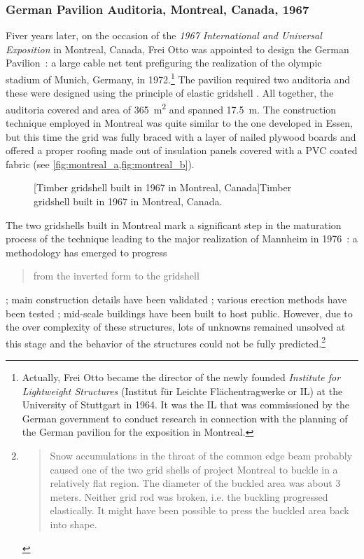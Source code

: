 \subsubsection{German Pavilion Auditoria, Montreal, Canada, 1967}
Fiver years later, on the occasion of the \emph{1967 International and Universal Exposition} in Montreal, Canada, Frei Otto was appointed to design the German Pavilion~: a large cable net tent prefiguring the realization of the olympic stadium of Munich, Germany, in 1972.\footnote{Actually, Frei Otto became the director of the newly founded \emph{Institute for Lightweight Structures} (Institut für Leichte Flächentragwerke or IL) at the University of Stuttgart in 1964. It was the IL that was commissioned by the German government to conduct research in connection with the planning of the German pavilion for the exposition in Montreal.} The pavilion required two auditoria and these were designed using the principle of elastic gridshell \cite[p.~274]{IL10}. All together, the auditoria covered and area of \SI{365}{m^2} and spanned \SI{17.5}{m}. The construction technique employed in Montreal was quite similar to the one developed in Essen, but this time the grid was fully braced with a layer of nailed plywood boards and offered a proper roofing made out of insulation panels covered with a PVC coated fabric (see \cref{fig:montreal_a,fig:montreal_b}).
\begin{figure}[t]
		\hspace*{\fill}
		\vspace{10pt}
		[Timber gridshell built in 1967 in Montreal, Canada]{Timber gridshell built in 1967 in Montreal, Canada.}
		\label{fig:montreal}    
\end{figure}

The two gridshells built in Montreal mark a significant step in the maturation process of the technique leading to the major realization of Mannheim in 1976~: a methodology has emerged to progress \blockcquote[p.~179]{IL10}{from the inverted form to the gridshell} ; main construction details have been validated ; various erection methods have been tested ; mid-scale buildings have been built to host public. However, due to the over complexity of these structures, lots of unknowns remained unsolved at this stage and the behavior of the structures could not be fully predicted.\footnote{\blockcquote[p.~219]{IL10}{Snow accumulations in the throat of the common edge beam probably caused one of the two grid shells of project Montreal to buckle in a relatively flat region. The diameter of the buckled area was about 3 meters. Neither grid rod was broken, i.e. the buckling progressed elastically. It might have been possible to press the buckled area back into shape.}}

